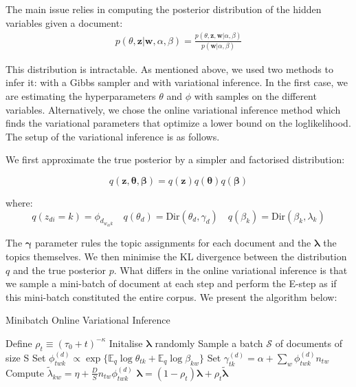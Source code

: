 \documentclass[twoside]{article}
\begin{document}
\begin{multicols}{2}
The main issue relies in computing the posterior distribution of the hidden variables given a document:\\

\begin{align*}
p(\theta, \mathbf{z} |\mathbf{w}, \alpha, \beta) = \frac{p(\theta, \mathbf{z}, \mathbf{w} | \alpha, \beta)}{p(\mathbf{w} | \alpha, \beta)}
\end{align*}

\noindent This distribution is intractable. As mentioned above, we used two  methods to infer it: with a Gibbs sampler and with variational inference. In the first case, we are estimating the hyperparameters $\theta$ and $\phi$ with samples on the different variables. Alternatively, we chose the online variational inference method which finds the variational parameters that optimize a lower bound on the loglikelihood. The setup \cite{OLLD} of the variational inference is as follows. 

\noindent We first approximate the true posterior by a simpler and factorised distribution:

$$q(\boldsymbol{z},\boldsymbol{\theta},\boldsymbol{\beta}) = q(\boldsymbol{z})q(\boldsymbol{\theta})q(\boldsymbol{\beta}) $$ 

\noindent where:
$$ q(z_{di} = k) = \phi_{d_{w_{di}k}} \quad q(\theta_d) = \text{Dir}(\theta_d,\gamma_d) \quad q(\beta_k) = \text{Dir}(\beta_k,\lambda_k) $$

\noindent The $\boldsymbol{\gamma}$ parameter rules the topic assignments for each document and the $\boldsymbol{\lambda}$ the topics themselves. We then minimise the KL divergence between the distribution $q$ and the true posterior $p$. What differs in the online variational inference is that we sample a mini-batch of document at each step and perform the E-step as if this mini-batch constituted the entire corpus. We present the algorithm below:

\begin{algorithm}[H]
\caption{Minibatch Online Variational Inference}\label{euclid}
\begin{algorithmic}[1]
\State Define $\rho_t \equiv (\tau_0 + t)^{-\kappa}$
\State Initalise $\boldsymbol{\lambda}$ randomly
\State Sample a batch $\mathcal{S}$ of documents of size S
\State Set $\phi^{(d)}_{twk} \propto \exp\{\mathbb{E}_q\log\theta_{tk} + \mathbb{E}_q\log\beta_{kw}\}$
\State Set $\gamma^{(d)}_{tk} = \alpha + \sum_{w} \phi^{(d)}_{twk}n_{tw}$
\EndWhile
\State Compute $\tilde{\lambda}_{kw} = \eta +\frac{D}{S}n_{tw}\phi^{(d)}_{twk}$
\EndFor
\State $\boldsymbol{\lambda} = (1-\rho_t)\boldsymbol{\lambda}+\rho_t\boldsymbol{\tilde{\lambda}}$
\EndFor
\end{algorithmic}
\end{algorithm}


\end{multicols}
\end{document}
